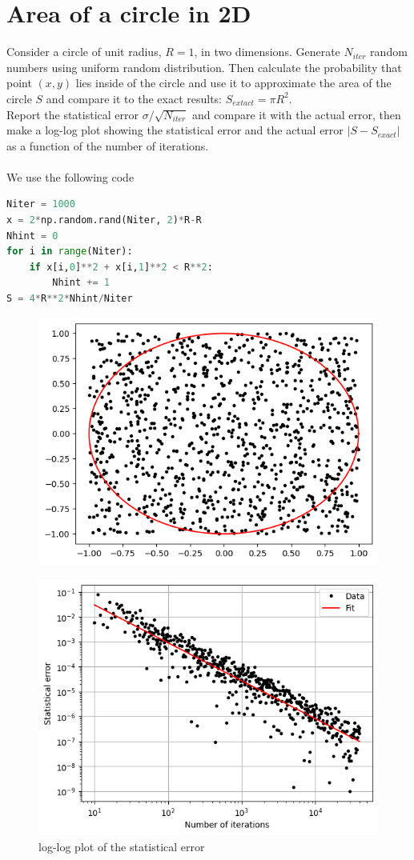 \documentclass{article}
\begin{document}
\section{Area of a circle in 2D}
Consider a circle of unit radius, $R=1$, in two dimensions. Generate $N_{iter}$ random numbers using uniform random distribution. Then calculate the probability that point $(x,y)$ lies inside of the circle and use it to approximate the area of the circle $S$ and compare it to the exact results: $S_{extact}=\pi R^2$.\\
Report the statistical error $\sigma/\sqrt{N_{iter}}$ and compare it with the actual error, then make a log-log plot showing the statistical error and the actual error $|S-S_{exact}|$ as a function of the number of iterations.\\\\
We use the following code 
\begin{lstlisting}[language=Python]
Niter = 1000
x = 2*np.random.rand(Niter, 2)*R-R
Nhint = 0
for i in range(Niter):
    if x[i,0]**2 + x[i,1]**2 < R**2:
        Nhint += 1
S = 4*R**2*Nhint/Niter
\end{lstlisting}
\begin{figure}[H]
    \centering
    \includegraphics[width=.7\linewidth]{images/Figure1.png}
    \caption{}
    \label{fig:1}
\end{figure}
\begin{figure}[H]
    \centering
    \includegraphics[width=.7\linewidth]{images/Figure1.2.png}
    \caption{log-log plot of the statistical error}
    \label{fig:1.1}
\end{figure}
\end{document}
